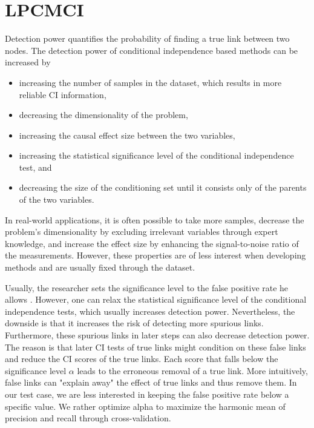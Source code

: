 \documentclass[conference]{IEEEtran}
\begin{document}
\section{LPCMCI}
Detection power quantifies the probability of finding a true link between two nodes.
The detection power of conditional independence based methods can be increased by
\begin{itemize}
    \item increasing the number of samples in the dataset, which results in more reliable CI information,
    \item decreasing the dimensionality of the problem\cite{runge_pcmci_2019},
    \item increasing the causal effect size between the two variables,
    \item increasing the statistical significance level of the conditional independence test, and
    \item decreasing the size of the conditioning set until it consists only of the parents of the two variables\cite{runge_pcmci_2019}.
\end{itemize}

In real-world applications, it is often possible to take more samples, decrease the problem's dimensionality by excluding irrelevant variables through expert knowledge, and increase the effect size by enhancing the signal-to-noise ratio of the measurements.
However, these properties are of less interest when developing methods and are usually fixed through the dataset.

Usually, the researcher sets the significance level to the false positive rate he allows \cite{gerhardus_high-recall_2021}.
However, one can relax the statistical significance level of the conditional independence tests, which usually increases detection power.
Nevertheless, the downside is that it increases the risk of detecting more spurious links.
Furthermore, these spurious links in later steps can also decrease detection power. The reason is that later CI tests of true links might condition on these false links and reduce the CI scores of the true links. Each score that falls below the significance level $\alpha$ leads to the erroneous removal of a true link. More intuitively, false links can "explain away" the effect of true links and thus remove them.
In our test case, we are less interested in keeping the false positive rate below a specific value. We rather optimize alpha to maximize the harmonic mean of precision and recall through cross-validation.
\end{document}
